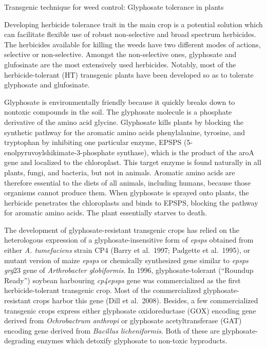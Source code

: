 \documentclass[
  ignorenonframetext,
  aspectratio=169]{beamer}
\begin{document}
\begin{frame}{Transgenic technique for weed control: Glyphosate
tolerance in plants}
\protect\hypertarget{transgenic-technique-for-weed-control-glyphosate-tolerance-in-plants}{}
\footnotesize

Developing herbicide tolerance trait in the main crop is a potential
solution which can facilitate flexible use of robust non-selective and
broad spectrum herbicides. The herbicides available for killing the
weeds have two different modes of actions, selective or non-selective.
Amongst the non-selective ones, glyphosate and glufosinate are the most
extensively used herbicides. Notably, most of the herbicide-tolerant
(HT) transgenic plants have been developed so as to tolerate glyphosate
and glufosinate.

Glyphosate is environmentally friendly because it quickly breaks down to
nontoxic compounds in the soil. The glyphosate molecule is a phosphate
derivative of the amino acid glycine. Glyphosate kills plants by
blocking the synthetic pathway for the aromatic amino acids
phenylalanine, tyrosine, and tryptophan by inhibiting one particular
enzyme, EPSPS (5-enolpyruvoylshikimate-3-phosphate synthase), which is
the product of the aroA gene and localized to the chloroplast. This
target enzyme is found naturally in all plants, fungi, and bacteria, but
not in animals. Aromatic amino acids are therefore essential to the
diets of all animals, including humans, because those organisms cannot
produce them. When glyphosate is sprayed onto plants, the herbicide
penetrates the chloroplasts and binds to EPSPS, blocking the pathway for
aromatic amino acids. The plant essentially starves to death.
\end{frame}

\begin{frame}{}
\protect\hypertarget{section}{}
The development of glyphosate-resistant transgenic crops has relied on
the heterologous expression of a glyphosate-insensitive form of
\emph{epsps} obtained from either \emph{A. tumefaciens} strain CP4
(Barry et al.~1997; Padgette et al.~1995), or mutant version of maize
\emph{epsps} or chemically synthesized gene similar to \emph{epsps}
\emph{grg}23 gene of \emph{Arthrobacter globiformis}. In 1996,
glyphosate-tolerant (``Roundup Ready'') soybean harbouring
\emph{cp4epsps} gene was commercialized as the first herbicide-tolerant
transgenic crop. Most of the commercialized glyphosate-resistant crops
harbor this gene (Dill et al.~2008). Besides, a few commercialized
transgenic crops express either glyphosate oxidoreductase (GOX) encoding
gene derived from \emph{Ochrobactrum anthropi} or glyphosate
acetyltransferase (GAT) encoding gene derived from \emph{Bacillus
licheniformis}. Both of these are glyphosate-degrading enzymes which
detoxify glyphosate to non-toxic byproducts.
\end{frame}
\end{document}
